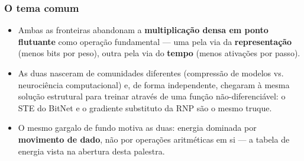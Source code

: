 \begin{frame}
	\frametitle{O tema comum}
	\begin{itemize}
		\item Ambas as fronteiras abandonam a \textbf{multiplicação densa em ponto flutuante} como operação fundamental --- uma pela via da \textbf{representação} (menos bits por peso), outra pela via do \textbf{tempo} (menos ativações por passo).
		\item As duas nasceram de comunidades diferentes (compressão de modelos vs. neurociência computacional) e, de forma independente, chegaram à mesma solução estrutural para treinar através de uma função não-diferenciável: o STE do BitNet e o gradiente substituto da RNP são o mesmo truque.
		\item O mesmo gargalo de fundo motiva as duas: energia dominada por \textbf{movimento de dado}, não por operações aritméticas em si --- a tabela de energia vista na abertura desta palestra.
	\end{itemize}
\end{frame}
